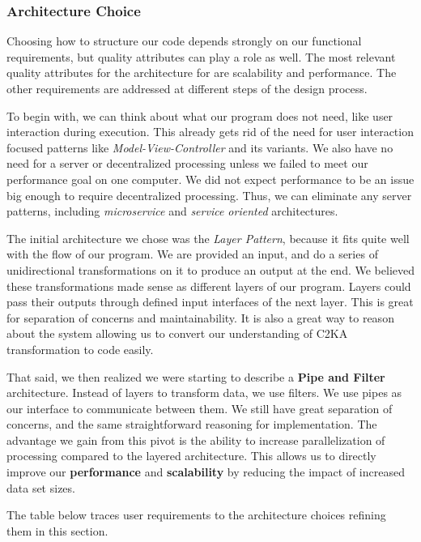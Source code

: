     \newpage
    \subsubsection{Architecture Choice}
    Choosing how to structure our code depends strongly on our functional requirements,
    but quality attributes can play a role as well.
    The most relevant quality attributes for the architecture for are scalability and performance.
    The other requirements are addressed at different steps of the design process.

    To begin with, we can think about what our program does not need, like user interaction during execution.
    This already gets rid of the need for user interaction focused patterns like \textit{Model-View-Controller} and its variants.
    We also have no need for a server or decentralized processing unless we failed to meet our performance goal on one computer.
    We did not expect performance to be an issue big enough to require decentralized processing.
    Thus, we can eliminate any server patterns, including \textit{microservice} and \textit{service oriented} architectures.

    The initial architecture we chose was the \textit{Layer Pattern}, because it fits quite well with the flow of our program.
    We are provided an input, and do a series of unidirectional transformations on it to produce an output at the end.
    We believed these transformations made sense as different layers of our program.
    Layers could pass their outputs through defined input interfaces of the next layer.
    This is great for separation of concerns and maintainability.
    It is also a great way to reason about the system allowing us to convert our understanding of C2KA transformation to code easily.

    That said, we then realized we were starting to describe a \textbf{Pipe and Filter} architecture.
    Instead of layers to transform data, we use filters.
    We use pipes as our interface to communicate between them.
    We still have great separation of concerns, and the same straightforward reasoning for implementation.
    The advantage we gain from this pivot is the ability to increase parallelization of processing compared to the layered architecture.
    This allows us to directly improve our \textbf{performance} and \textbf{scalability} by reducing the impact of increased data set sizes.

    The table below traces user requirements to the architecture choices refining them in this section.

